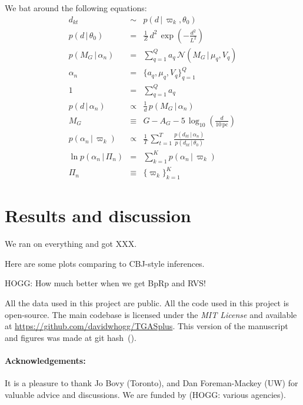 \documentclass[12pt]{article}
\newcommand{\project}[1]{\textsl{#1}}
\newcommand{\acronym}[1]{\small{#1}}
\newcommand{\given}{\,|\,}
\newcommand{\normal}{\mathcal{N}}
\newcommand{\setof}[1]{\{{#1}\}}
\newcommand{\pc}{\mathrm{pc}}
\begin{document}
We bat around the following equations:
\begin{eqnarray}
  d_{kt} &\sim& p(d\given\varpi_k,\theta_0)
  \\
  p(d\given\theta_0) &=& \frac{1}{Z}\,d^2\,\exp(-\frac{d^2}{L^2})
  \\
  p(M_G\given\alpha_n) &=& \sum_{q=1}^Q a_q\,\normal(M_G\given\mu_q,V_q)
  \\
  \alpha_n &=& \setof{a_q, \mu_q, V_q}_{q=1}^Q
  \\
  1 &=& \sum_{q=1}^Q a_q
  \\
  p(d\given\alpha_n) &\propto& \frac{1}{d}\,p(M_G\given\alpha_n)
  \\
  M_G &\equiv& G - A_G - 5\,\log_{10}(\frac{d}{10\,\pc})
  \\
  p(\alpha_n\given\varpi_k) &\propto& \frac{1}{T}\,\sum_{t=1}^T \frac{p(d_{kt}\given\alpha_n)}{p(d_{kt}\given\theta_0)}
  \\
  \ln p(\alpha_n\given\Pi_n) &=& \sum_{k=1}^K p(\alpha_n\given\varpi_k)
  \\
  \Pi_n &\equiv& \setof{\varpi_k}_{k=1}^K
\end{eqnarray}

\section{Results and discussion}
We ran on everything and got XXX.

Here are some plots comparing to CBJ-style inferences.

HOGG: How much better when we get BpRp and RVS!

All the data used in this project are public. All the code used in
this project is open-source. The main codebase is licensed under the
\project{\acronym{MIT} License} and available at
\url{https://github.com/davidwhogg/TGASplus}. This version of the
manuscript and figures was made at git hash
\textsf{\githash\,(\gitdate)}.

\paragraph{Acknowledgements:}
It is a pleasure to thank
  Jo Bovy (Toronto),
  and
  Dan Foreman-Mackey (UW)
for valuable advice and discussions.
We are funded by (HOGG: various agencies).
\end{document}
